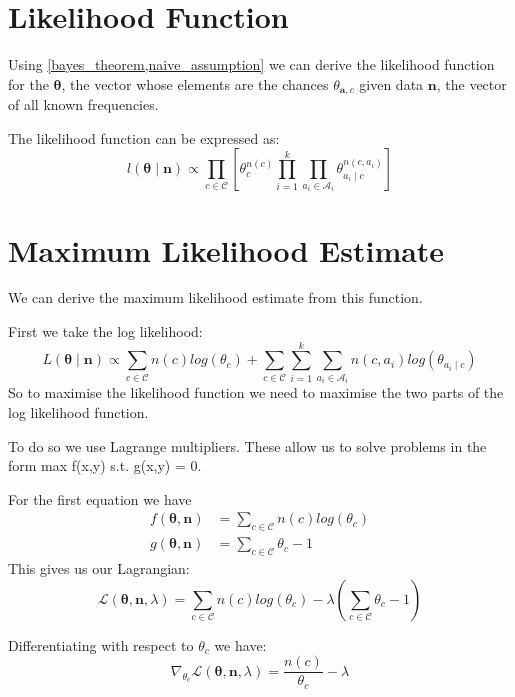\section{Likelihood Function}

Using \cref{bayes_theorem,naive_assumption} we can derive the likelihood function for the $\mathbf{\theta}$, the vector whose elements are the chances $\theta_{\mathbf{a}, c}$ given data $\mathbf{n}$, the vector of all known frequencies.

The likelihood function can be expressed as:
\begin{equation} \label{likelihood}
	l(\mathbf{\theta} \mid \mathbf{n}) \propto \prod_{c \in \mathcal{C}} \left[ \theta_c^{n(c)} \prod_{i=1}^k \prod_{a_i \in \mathcal{A}_i} \theta_{a_i \mid c}^{n(c, a_i)} \right]
\end{equation}

\section{Maximum Likelihood Estimate}

We can derive the maximum likelihood estimate from this function.

First we take the log likelihood:
\begin{equation}
	L(\mathbf{\theta} \mid \mathbf{n}) \propto \sum_{c \in \mathcal{C}}  n(c)log(\theta_c) + \sum_{c \in \mathcal{C}} \sum_{i=1}^k \sum_{a_i \in \mathcal{A}_i} n(c, a_i) log(\theta_{a_i \mid c}) 
\end{equation}
So to maximise the likelihood function we need to maximise the two parts of the log likelihood function.

To do so we use Lagrange multipliers. These allow us to solve problems in the form max f(x,y) s.t. g(x,y) = 0.

For the first equation we have
\begin{align}
	f(\mathbf{\theta}, \mathbf{n})& = \sum_{c \in \mathcal{C}}  n(c)log(\theta_c) \\
	g(\mathbf{\theta}, \mathbf{n})& = \sum_{c \in \mathcal{C}}  \theta_c - 1
\end{align}
This gives us our Lagrangian:
\begin{equation}
	\mathcal{L}(\mathbf{\theta}, \mathbf{n}, \lambda) = \sum_{c \in \mathcal{C}}  n(c)log(\theta_c) - \lambda(\sum_{c \in \mathcal{C}}  \theta_c - 1)
\end{equation}

Differentiating with respect to $\theta_c$ we have:
\begin{equation}
	\nabla_{\theta_c} \mathcal{L}(\mathbf{\theta}, \mathbf{n}, \lambda) = \frac{n(c)}{\theta_c} - \lambda
\end{equation}

